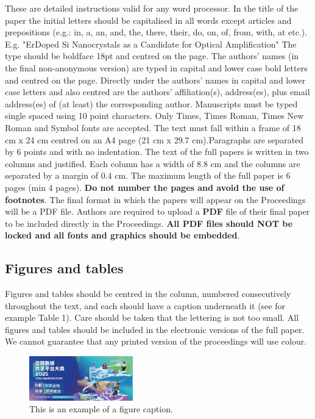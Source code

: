 \documentclass[10pt,twocolumn]{article}
\begin{document}
These are detailed instructions valid for any word
processor. In the title of the paper the initial letters should be
capitalised in all words except articles and prepositions (e.g.:
in, a, an, and, the, there, their, do, on, of, from, with, at etc.).
E.g. "ErDoped Si Nanocrystals as a Candidate for Optical
Amplification" The type should be boldface 18pt and centred
on the page. The authors' names (in the final non-anonymous version) are typed in capital and lower
case bold letters and centred on the page. Directly under the
authors' names in capital and lower case letters and also
centred are the authors' affiliation(s), address(es), plus email
address(es) of (at least) the corresponding author. Manuscripts must be
typed single spaced using 10 point characters. Only Times,
Times Roman, Times New Roman and Symbol fonts are
accepted. The text must fall within a frame of 18 cm x 24 cm
centred on an A4 page (21 cm x 29.7 cm).Paragraphs are
separated by 6 points and with no indentation. The text of the
full papers is written in two columns and justified. Each
column has a width of 8.8 cm and the columns are separated
by a margin of 0.4 cm. The maximum length of the full paper
is 6 pages (min 4 pages). \textbf{Do not number the pages and avoid the use of footnotes}. The final format in
which the papers will appear on the Proceedings will be a
PDF file. Authors are required to upload a \textbf{PDF} file of their
final paper to be included directly in the Proceedings. \textbf{All
PDF files should NOT be locked and all fonts and
graphics should be embedded}.

\subsection{Figures and tables}
Figures and tables should be centred in the column, numbered
consecutively throughout the text, and each should have a
caption underneath it (see for example Table 1). Care should
be taken that the lettering is not too small. All figures and
tables should be included in the electronic versions of the full
paper. We cannot guarantee that any printed version of the
proceedings will use colour.


\begin{figure}[h]
\centering
\includegraphics[width=0.4\textwidth]{figures/template_figure_1.png}
\caption{\label{tab1}This is an example of a figure caption.} 
\end{figure}
\end{document}
